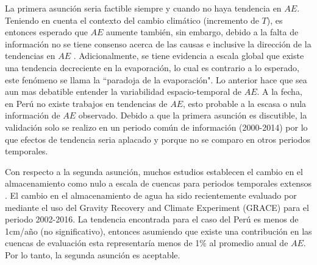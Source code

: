 \documentclass[12pt]{article}
\begin{document}
La primera asunción seria factible siempre y cuando no haya tendencia en $AE$. Teniendo en cuenta el contexto del cambio climático (incremento de $T$), es entonces esperado que $AE$ aumente también, sin embargo, debido a la falta de información no se tiene consenso acerca de las causas e inclusive la dirección de la tendencias en $AE$ \citep{hobbins2004trends,cong2009does,wang2011trends,miralles2016wacmos,douville2013anthropogenic,zhang2016multi}. Adicionalmente, se tiene evidencia a escala global que existe una tendencia decreciente en la evaporación, lo cual es contrario a lo esperado, este fenómeno se llama la “paradoja de la evaporación". Lo anterior hace que sea aun mas debatible entender la variabilidad espacio-temporal de $AE$. A la fecha, en Perú no existe trabajos en tendencias de $AE$, esto probable a la escasa o nula información de $AE$ observado. Debido a que la primera asunción es discutible, la validación solo se realizo en un periodo común de información (2000-2014) por lo que efectos de tendencia seria aplacado y porque no se comparo en otros periodos temporales.

Con respecto a la segunda asunción, muchos estudios establecen el cambio en el almacenamiento como nulo a escala de cuencas para periodos temporales extensos \citep{Budyko1961,Fu1981,Zhang2008,Wang2014,Singh2015}. El cambio en el almacenamiento de agua ha sido recientemente evaluado por \citet{rodell2018emerging} mediante el uso del Gravity Recovery and Climate Experiment (GRACE) para el periodo 2002-2016. La tendencia encontrada para el caso del Perú es menos de 1cm/año (no significativo), entonces asumiendo que existe una contribución en las cuencas de evaluación esta representaría menos de 1\% al promedio anual de $AE$. Por lo tanto, la segunda asunción es aceptable. 
\end{document}
